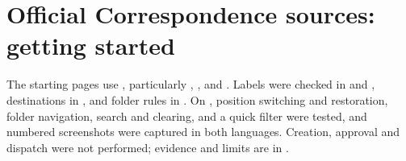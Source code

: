 \section{Official Correspondence sources: getting started}
\label{sec:sources-correspondence}
The starting pages use , particularly , ,  and . Labels were checked in  and , destinations in , and folder rules in .
On , position switching and restoration, folder navigation, search and clearing, and a quick filter were tested, and numbered screenshots were captured in both languages. Creation, approval and dispatch were not performed; evidence and limits are in .
